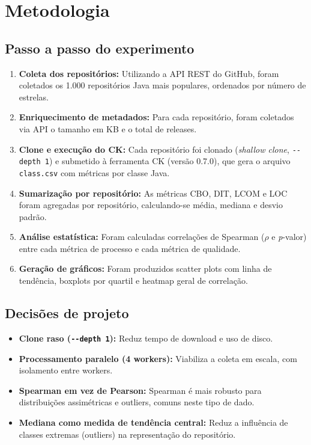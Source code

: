 \documentclass[12pt,a4paper]{article}
\begin{document}
\newpage

\section{Metodologia}

\subsection{Passo a passo do experimento}

\begin{enumerate}
    \item \textbf{Coleta dos repositórios:} Utilizando a API REST do GitHub, foram coletados os 1.000 repositórios Java mais populares, ordenados por número de estrelas.
    \item \textbf{Enriquecimento de metadados:} Para cada repositório, foram coletados via API o tamanho em KB e o total de releases.
    \item \textbf{Clone e execução do CK:} Cada repositório foi clonado (\textit{shallow clone}, \texttt{-{}-depth~1}) e submetido à ferramenta CK (versão 0.7.0), que gera o arquivo \texttt{class.csv} com métricas por classe Java.
    \item \textbf{Sumarização por repositório:} As métricas CBO, DIT, LCOM e LOC foram agregadas por repositório, calculando-se média, mediana e desvio padrão.
    \item \textbf{Análise estatística:} Foram calculadas correlações de Spearman ($\rho$ e \textit{p}-valor) entre cada métrica de processo e cada métrica de qualidade.
    \item \textbf{Geração de gráficos:} Foram produzidos scatter plots com linha de tendência, boxplots por quartil e heatmap geral de correlação.
\end{enumerate}

\subsection{Decisões de projeto}

\begin{itemize}
    \item \textbf{Clone raso (\texttt{-{}-depth 1}):} Reduz tempo de download e uso de disco.
    \item \textbf{Processamento paralelo (4 workers):} Viabiliza a coleta em escala, com isolamento entre workers.
    \item \textbf{Spearman em vez de Pearson:} Spearman é mais robusto para distribuições assimétricas e outliers, comuns neste tipo de dado.
    \item \textbf{Mediana como medida de tendência central:} Reduz a influência de classes extremas (outliers) na representação do repositório.
\end{itemize}
\end{document}
